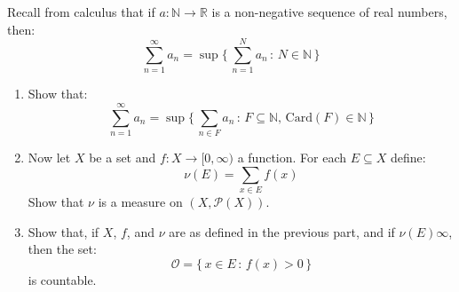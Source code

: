 \documentclass[crop=false,class=article]{standalone}                           %
\begin{document}
        \begin{problem}
            Recall from calculus that if $a:\mathbb{N}\rightarrow\mathbb{R}$ is a
            non-negative sequence of real numbers, then:
            \begin{equation}
                \sum_{n=1}^{\infty}a_{n}
                    =\sup\Big\{\,\sum_{n=1}^{N}a_{n}\,:\,N\in\mathbb{N}\,\Big\}
            \end{equation}
            \begin{enumerate}
                \item   Show that:
                        \begin{equation}
                            \sum_{n=1}^{\infty}a_{n}
                            =\sup\Big\{\,\sum_{n\in{F}}a_{n}\,:\,
                                F\subseteq\mathbb{N},\,
                                \textrm{Card}(F)\in\mathbb{N}\,
                            \Big\}
                        \end{equation}
                \item   Now let $X$ be a set and $f:X\rightarrow[0,\infty)$ a
                        function. For each $E\subseteq{X}$ define:
                        \begin{equation}
                            \nu(E)=\sum_{x\in{E}}f(x)
                        \end{equation}
                        Show that $\nu$ is a measure on $(X,\mathcal{P}(X))$.
                \item   Show that, if $X$, $f$, and $\nu$ are as defined in the
                        previous part, and if $\nu(E)\infty$, then the set:
                        \begin{equation}
                            \mathcal{O}=\{\,x\in{E}\,:\,f(x)>0\,\}
                        \end{equation}
                        is countable.
            \end{enumerate}
        \end{problem}
\end{document}
